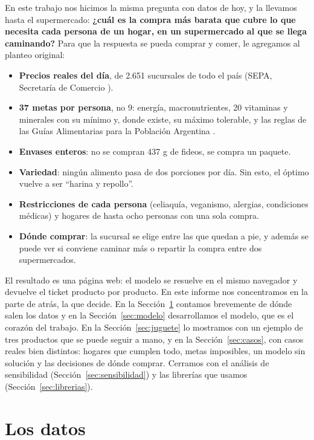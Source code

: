 \documentclass[10pt,a4paper]{article}
\begin{document}
En este trabajo nos hicimos la misma pregunta con datos de hoy, y la llevamos hasta
el supermercado: \textbf{¿cuál es la compra más barata que cubre lo que necesita cada
persona de un hogar, en un supermercado al que se llega caminando?} Para que la
respuesta se pueda comprar y comer, le agregamos al planteo original:

\begin{itemize}
  \item \textbf{Precios reales del día}, de 2.651 sucursales de todo el país (SEPA,
        Secretaría de Comercio \cite{sepa}).
  \item \textbf{37 metas por persona}, no 9: energía, macronutrientes, 20 vitaminas y
        minerales con su mínimo y, donde existe, su máximo tolerable, y las reglas de
        las Guías Alimentarias para la Población Argentina \cite{guias}.
  \item \textbf{Envases enteros}: no se compran 437 g de fideos, se compra un paquete.
  \item \textbf{Variedad}: ningún alimento pasa de dos porciones por día. Sin esto, el
        óptimo vuelve a ser ``harina y repollo''.
  \item \textbf{Restricciones de cada persona} (celiaquía, veganismo, alergias,
        condiciones médicas) y hogares de hasta ocho personas con una sola compra.
  \item \textbf{Dónde comprar}: la sucursal se elige entre las que quedan a pie, y
        además se puede ver si conviene caminar más o repartir la compra entre dos
        supermercados.
\end{itemize}

El resultado es una página web: el modelo se resuelve en el mismo navegador y
devuelve el ticket producto por producto. En este informe nos concentramos en la
parte de atrás, la que decide. En la Sección~\ref{sec:datos} contamos brevemente de
dónde salen los datos y en la Sección~\ref{sec:modelo} desarrollamos el modelo, que
es el corazón del trabajo. En la Sección~\ref{sec:juguete} lo mostramos con un
ejemplo de tres productos que se puede seguir a mano, y en la
Sección~\ref{sec:casos}, con casos reales bien distintos: hogares que cumplen todo,
metas imposibles, un modelo sin solución y las decisiones de dónde comprar. Cerramos
con el análisis de sensibilidad (Sección~\ref{sec:sensibilidad}) y las librerías que
usamos (Sección~\ref{sec:librerias}).

\section{Los datos}
\label{sec:datos}
\end{document}

